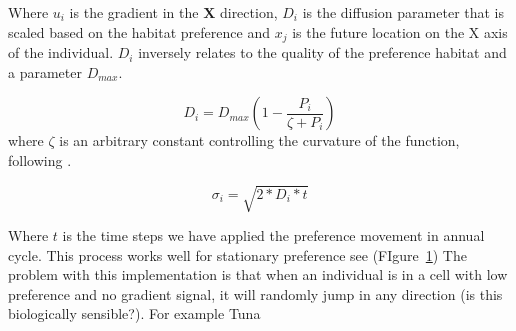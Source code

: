 Where $u_i$ is the gradient in the $\textbf{X}$ direction, $D_{i}$ is the diffusion parameter that is scaled based on the habitat preference and $x_j$ is the future location on the X axis of the individual. $D_{i}$ inversely relates to the quality of the preference habitat and a parameter $D_{max}$.

\begin{equation}
D_i = D_{max}\left(1 - \frac{P_i}{\zeta + P_i}\right)
\end{equation}
where $\zeta$ is an arbitrary constant controlling the curvature of the function, following \cite{Bertignac1998}.

\begin{equation}
\sigma_i = \sqrt{2 * D_i * t}
\end{equation}

Where $t$ is the time steps we have applied the preference movement in annual cycle. This process works well for stationary preference see (FIgure~\ref{fig:static_pref}) The problem with this implementation is that when an individual is in a cell with low preference and no gradient signal, it will randomly jump in any direction (is this biologically sensible?). For example Tuna

\begin{figure}[htp]\label{fig:pref}%
	\centering
	\qquad
	\label{fig:static_pref}%
\end{figure}




